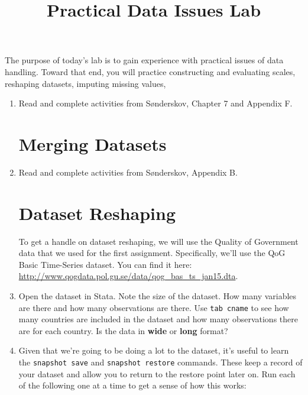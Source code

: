 \documentclass[a4paper,12pt]{article}
\title{Practical Data Issues Lab}
\author{}
\date{}
\begin{document}
	
\maketitle

\vspace{-2em}
	
\noindent The purpose of today's lab is to gain experience with practical issues of data handling. Toward that end, you will practice constructing and evaluating scales, reshaping datasets, imputing missing values, 

\begin{enumerate}\itemsep1em

\section*{Scale Construction}

\item Read and complete activities from S{\o}nderskov, Chapter 7 and Appendix F.

\section*{Merging Datasets}

\item Read and complete activities from S{\o}nderskov, Appendix B.

\section*{Dataset Reshaping}

To get a handle on dataset reshaping, we will use the Quality of Government data that we used for the first assignment. Specifically, we'll use the QoG Basic Time-Series dataset. You can find it here: \url{http://www.qogdata.pol.gu.se/data/qog_bas_ts_jan15.dta}.

\item Open the dataset in Stata. Note the size of the dataset. How many variables are there and how many observations are there. Use \texttt{tab cname} to see how many countries are included in the dataset and how many observations there are for each country. Is the data in \textbf{wide} or \textbf{long} format?

\item Given that we're going to be doing a lot to the dataset, it's useful to learn the \texttt{snapshot save} and \texttt{snapshot restore} commands. These keep a record of your dataset and allow you to return to the restore point later on. Run each of the following one at a time to get a sense of how this works:


\end{enumerate}
\end{document}
